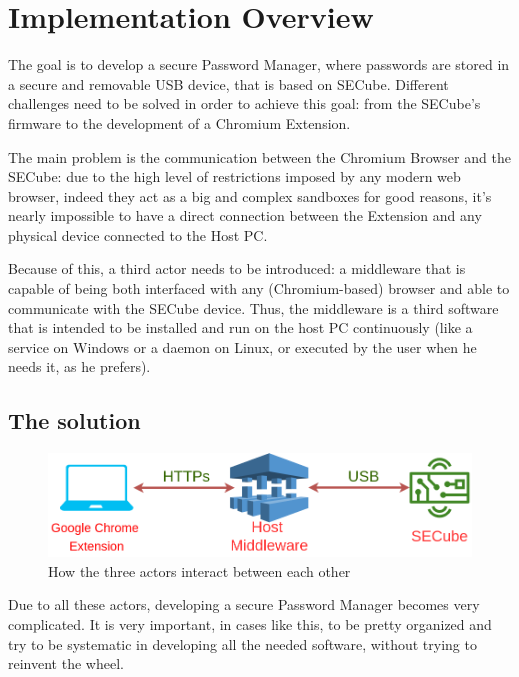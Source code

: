 \chapter{Implementation Overview}
\label{sec:implementation-overview}

The goal is to develop a secure Password Manager, where passwords are stored in a secure and removable USB device, that is based on SECube. Different challenges need to be solved in order to achieve this goal: from the SECube's firmware to the development of a Chromium Extension. \bigskip

The main problem is the communication between the Chromium Browser and the SECube: due to the high level of restrictions imposed by any modern web browser, indeed they act as a big and complex sandboxes for good reasons, it's nearly impossible to have a direct connection between the Extension and any physical device connected to the Host PC. \bigskip

Because of this, a third actor needs to be introduced: a middleware that is capable of being both interfaced with any (Chromium-based) browser and able to communicate with the SECube device. Thus, the middleware is a third software that is intended to be installed and run on the host PC continuously (like a service on Windows or a daemon on Linux, or executed by the user when he needs it, as he prefers). \bigskip

\section{The solution}

\begin{figure}[H]
	\centering
	\includegraphics[width=0.9\linewidth]{images/overview}
	\caption{How the three actors interact between each other}
	\label{fig:overview}
\end{figure}

Due to all these actors, developing a secure Password Manager becomes very complicated. It is very important, in cases like this, to be pretty organized and try to be systematic in developing all the needed software, without trying to reinvent the wheel. \bigskip

